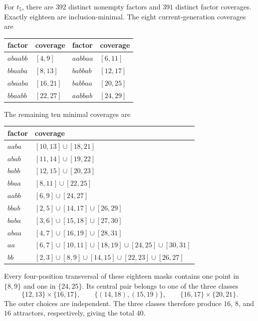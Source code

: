 For $t_5$, there are $392$ distinct nonempty factors and $391$ distinct factor coverages.  Exactly eighteen are inclusion-minimal.  The eight current-generation coverages are

\begin{center}
\begin{tabular}{ll@{\qquad}ll}
\toprule
factor & coverage & factor & coverage\\
\midrule
$abaabb$ & $[4,9]$ & $aabbaa$ & $[6,11]$\\
$bbaaba$ & $[8,13]$ & $babbab$ & $[12,17]$\\
$abaaba$ & $[16,21]$ & $babbaa$ & $[20,25]$\\
$bbaabb$ & $[22,27]$ & $aabbab$ & $[24,29]$\\
\bottomrule
\end{tabular}
\end{center}

The remaining ten minimal coverages are

\begin{center}
\begin{tabular}{ll}
\toprule
factor & coverage\\
\midrule
$aaba$ & $[10,13]\cup[18,21]$\\
$abab$ & $[11,14]\cup[19,22]$\\
$babb$ & $[12,15]\cup[20,23]$\\
$bbaa$ & $[8,11]\cup[22,25]$\\
$aabb$ & $[6,9]\cup[24,27]$\\
$bbab$ & $[2,5]\cup[14,17]\cup[26,29]$\\
$baba$ & $[3,6]\cup[15,18]\cup[27,30]$\\
$abaa$ & $[4,7]\cup[16,19]\cup[28,31]$\\
$aa$ & $[6,7]\cup[10,11]\cup[18,19]\cup[24,25]\cup[30,31]$\\
$bb$ & $[2,3]\cup[8,9]\cup[14,15]\cup[22,23]\cup[26,27]$\\
\bottomrule
\end{tabular}
\end{center}

Every four-position transversal of these eighteen masks contains one point in $\{8,9\}$ and one in $\{24,25\}$.  Its central pair belongs to one of the three classes
\[
 \{12,13\}\times\{16,17\},
 \qquad
 \{(14,18),(15,19)\},
 \qquad
 \{16,17\}\times\{20,21\}.
\]
The outer choices are independent.  The three classes therefore produce $16$, $8$, and $16$ attractors, respectively, giving the total $40$.


